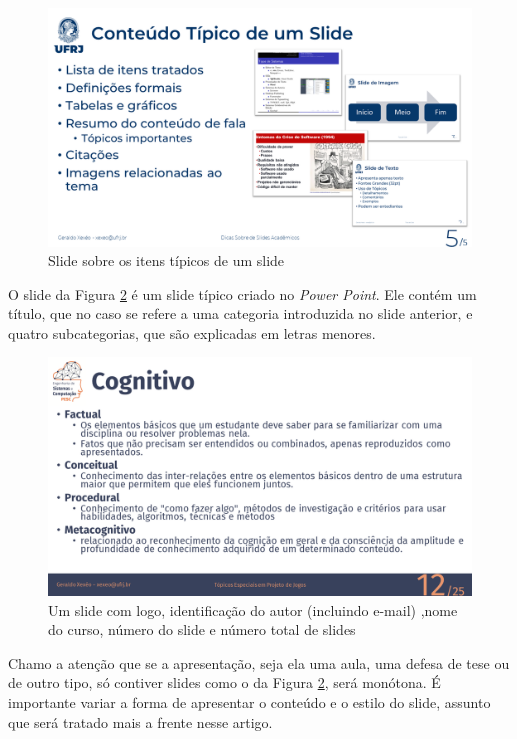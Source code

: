 \begin{figure}[hbt]
    \centering
    \includegraphics[width=0.7\linewidth]{imagens/itenstipicos}
    \caption{Slide sobre os itens típicos de um slide}
    \label{fig:itenstipicos}
\end{figure}



O slide da Figura \ref{fig:coppe} é um slide típico criado no \textit{Power Point}. Ele contém um título, que no caso se refere a uma categoria introduzida no slide anterior, e quatro subcategorias, que são explicadas em letras menores.

\begin{figure}[htb]
    \centering
    \includegraphics[width=\tam\linewidth,frame]{imagens/slideexemplotepj.png}
    \caption{Um slide com logo, identificação do autor (incluindo e-mail) ,nome do curso,   número do slide e número total de slides}
    \label{fig:coppe}
\end{figure}

Chamo a atenção que se a apresentação, seja ela uma aula, uma defesa de tese ou de outro tipo, só contiver slides como o da Figura \ref{fig:coppe},  será monótona.
 É importante variar a forma de apresentar o conteúdo e o estilo do slide, assunto que será tratado mais a frente nesse artigo.

